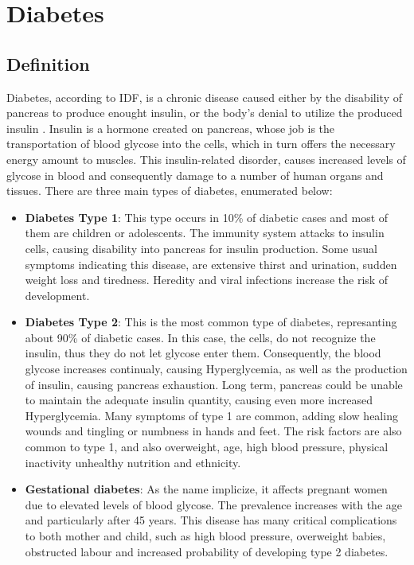 \documentclass[journal,article,submit,pdftex,moreauthors]{Definitions/mdpi}
\begin{document}
\section{Diabetes}
\subsection{Definition}
Diabetes, according to IDF, is a chronic disease caused either by the disability of pancreas to produce enought insulin,
or the body's denial to utilize the produced insulin \cite{idf}. Insulin is a hormone created on pancreas, whose job is the 
transportation of blood glycose into the cells, which in turn offers the necessary energy amount to muscles.
This insulin-related disorder, causes increased levels of glycose in blood and consequently damage to a number of human organs and 
tissues. There are three main types of diabetes, enumerated below:
\begin{itemize}
	\item \textbf{Diabetes Type 1}: This type occurs in 10\% of diabetic cases and most of them are children or adolescents. The 
	immunity system attacks to insulin cells, causing disability into pancreas for insulin production. Some usual symptoms indicating this disease, are extensive thirst 
	and urination, sudden weight loss and tiredness. Heredity and viral infections increase the risk of development.
	\item \textbf{Diabetes Type 2}: This is the most common type of diabetes, represanting about 90\% of diabetic cases. In this case,
	the cells, do not recognize the insulin, thus they do not let glycose enter them. Consequently, the blood glycose increases
	continualy, causing Hyperglycemia, as well as the production of insulin, causing pancreas exhaustion. Long term, pancreas
	could be unable to maintain the adequate insulin quantity, causing even more increased Hyperglycemia. Many symptoms of type 1
	are common, adding slow healing wounds and tingling or numbness in hands and feet. The risk factors are also common to type 1,
	and also overweight, age, high blood pressure, physical inactivity unhealthy nutrition and ethnicity.
	\item \textbf{Gestational diabetes}: As the name implicize, it affects pregnant women due to elevated levels of blood glycose.
	The prevalence increases with the age and particularly after 45 years. This disease has many critical complications to both
	mother and child, such as high blood pressure, overweight babies, obstructed labour and increased probability of developing 
    type 2 diabetes.
\end{itemize}
\end{document}
